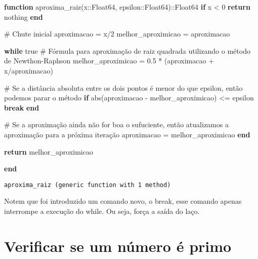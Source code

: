 \documentclass[
  letterpaper,
  DIV=11,
  numbers=noendperiod]{scrreprt}
\newenvironment{Shaded}{\begin{snugshade}}{\end{snugshade}}
\newcommand{\CommentTok}[1]{\textcolor[rgb]{0.37,0.37,0.37}{#1}}
\newcommand{\ConstantTok}[1]{\textcolor[rgb]{0.56,0.35,0.01}{#1}}
\newcommand{\ControlFlowTok}[1]{\textcolor[rgb]{0.00,0.23,0.31}{\textbf{#1}}}
\newcommand{\DataTypeTok}[1]{\textcolor[rgb]{0.68,0.00,0.00}{#1}}
\newcommand{\FloatTok}[1]{\textcolor[rgb]{0.68,0.00,0.00}{#1}}
\newcommand{\FunctionTok}[1]{\textcolor[rgb]{0.28,0.35,0.67}{#1}}
\newcommand{\KeywordTok}[1]{\textcolor[rgb]{0.00,0.23,0.31}{\textbf{#1}}}
\newcommand{\NormalTok}[1]{\textcolor[rgb]{0.00,0.23,0.31}{#1}}
\newcommand{\OperatorTok}[1]{\textcolor[rgb]{0.37,0.37,0.37}{#1}}
\begin{document}
\begin{Shaded}
\begin{Highlighting}[]
\KeywordTok{function} \FunctionTok{aproxima\_raiz}\NormalTok{(x}\OperatorTok{::}\DataTypeTok{Float64}\NormalTok{, epsilon}\OperatorTok{::}\DataTypeTok{Float64}\NormalTok{)}\OperatorTok{::}\DataTypeTok{Float64}
    \ControlFlowTok{if}\NormalTok{ x }\OperatorTok{\textless{}} \FloatTok{0}
        \ControlFlowTok{return} \ConstantTok{nothing}
    \ControlFlowTok{end}

    \CommentTok{\# Chute inicial }
\NormalTok{    aproximacao }\OperatorTok{=}\NormalTok{ x}\OperatorTok{/}\FloatTok{2}
\NormalTok{    melhor\_aproximicao }\OperatorTok{=}\NormalTok{ aproximacao}

    \ControlFlowTok{while} \ConstantTok{true}
        \CommentTok{\# Fórmula para aproximação de raiz quadrada utilizando o método de Newthon{-}Raphson}
\NormalTok{        melhor\_aproximicao }\OperatorTok{=} \FloatTok{0.5} \OperatorTok{*}\NormalTok{ (aproximacao }\OperatorTok{+}\NormalTok{ x}\OperatorTok{/}\NormalTok{aproximacao)}

        \CommentTok{\# Se a distância absoluta entre os dois pontos é menor do que epsilon, então podemos parar o método}
        \ControlFlowTok{if} \FunctionTok{abs}\NormalTok{(aproximacao }\OperatorTok{{-}}\NormalTok{ melhor\_aproximicao) }\OperatorTok{\textless{}=}\NormalTok{ epsilon}
            \ControlFlowTok{break}
        \ControlFlowTok{end}

        \CommentTok{\# Se a aproximação ainda não for boa o sufuciente, então atualizamos a aproximação para a próxima iteração}
\NormalTok{        aproximacao }\OperatorTok{=}\NormalTok{ melhor\_aproximicao}
    \ControlFlowTok{end}

    \ControlFlowTok{return}\NormalTok{ melhor\_aproximicao}

\KeywordTok{end}
\end{Highlighting}
\end{Shaded}

\begin{verbatim}
aproxima_raiz (generic function with 1 method)
\end{verbatim}

Notem que foi introduzido um comando novo, o break, esse comando apenas
interrompe a execução do while. Ou seja, força a saída do laço.

\section{Verificar se um número é
primo}\label{verificar-se-um-nuxfamero-uxe9-primo}
\end{document}
